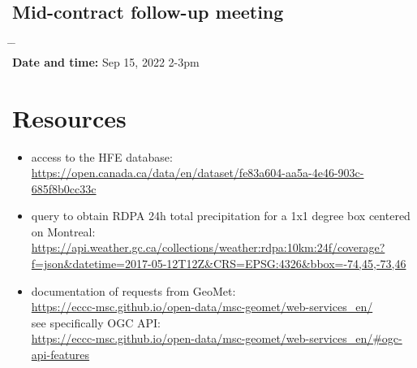 \documentclass[10pt,a4paper,titlepage,parskip]{scrartcl}
\begin{document}
\subsection{Mid-contract follow-up meeting}
\vspace*{-0.5cm}
\begin{tabbing}
	\hspace{2.8cm} \= \hspace{4cm} \= \kill \\
	\textbf{Date and time:} 	\> Sep 15, 2022 2-3pm\\
\end{tabbing}
\vspace*{-0.5cm}

\section{Resources}

\begin{itemize}
	\setlength\itemsep{-0.8em}
	\item access to the HFE database:\\
	\url{https://open.canada.ca/data/en/dataset/fe83a604-aa5a-4e46-903c-685f8b0cc33c}
	\item query to obtain RDPA 24h total precipitation for a 1x1 degree box centered on Montreal:\\
	\url{https://api.weather.gc.ca/collections/weather:rdpa:10km:24f/coverage?f=json&datetime=2017-05-12T12Z&CRS=EPSG:4326&bbox=-74,45,-73,46}
	\item documentation of requests from GeoMet:\\
	\url{https://eccc-msc.github.io/open-data/msc-geomet/web-services_en/}\\
	see specifically OGC API:\\
	\url{https://eccc-msc.github.io/open-data/msc-geomet/web-services_en/#ogc-api-features}
\end{itemize}
\pagebreak
\end{document}
